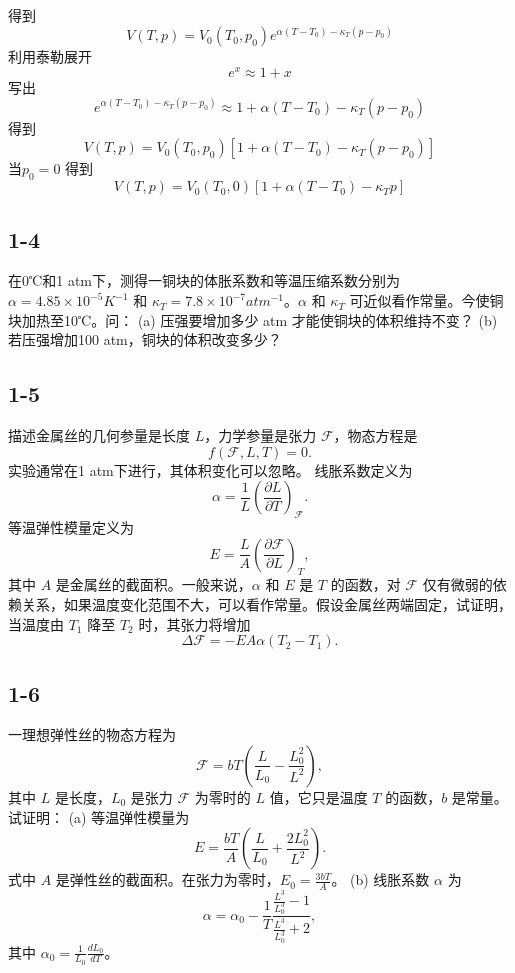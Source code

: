 得到
\begin{equation}
    V(T,p)=V_0(T_0,p_0)e^{\alpha \left( T-T_0 \right) -\kappa _T\left( p-p_0 \right)}
\end{equation}
利用泰勒展开
\begin{equation}
    e^x\approx 1+x
\end{equation}
写出
\begin{equation}
    e^{\alpha \left( T-T_0 \right) -\kappa _T\left( p-p_0 \right)}\approx 1+\alpha \left( T-T_0 \right) -\kappa _T\left( p-p_0 \right) 
\end{equation}
得到
\begin{equation}
    V(T,p)=V_0(T_0,p_0)\left[ 1+\alpha \left( T-T_0 \right) -\kappa _T\left( p-p_0 \right) \right] 
\end{equation}
当$p_0=0$
得到
\begin{equation}
    V(T,p)=V_0(T_0,0)\left[ 1+\alpha \left( T-T_0 \right) -\kappa _Tp \right] 
\end{equation}

\newpage
\subsection{1-4}
在0℃和1 atm下，测得一铜块的体胀系数和等温压缩系数分别为 $\alpha = 4.85 \times 10^{-5} K^{-1}$ 和 $\kappa_T = 7.8 \times 10^{-7} atm^{-1}$。$\alpha$ 和 $\kappa_T$ 可近似看作常量。今使铜块加热至10℃。问：
(a) 压强要增加多少 atm 才能使铜块的体积维持不变？
(b) 若压强增加100 atm，铜块的体积改变多少？

\newpage
\subsection{1-5}
描述金属丝的几何参量是长度 $L$，力学参量是张力 $\mathcal{F}$，物态方程是
$$f(\mathcal{F}, L, T) = 0.$$
实验通常在1 atm下进行，其体积变化可以忽略。
线胀系数定义为
$$\alpha = \frac{1}{L} \left( \frac{\partial L}{\partial T} \right)_{\mathcal{F}}.$$
等温弹性模量定义为
$$E = \frac{L}{A} \left( \frac{\partial \mathcal{F}}{\partial L} \right)_T,$$
其中 $A$ 是金属丝的截面积。一般来说，$\alpha$ 和 $E$ 是 $T$ 的函数，对 $\mathcal{F}$ 仅有微弱的依赖关系，如果温度变化范围不大，可以看作常量。假设金属丝两端固定，试证明，当温度由 $T_1$ 降至 $T_2$ 时，其张力将增加
$$\Delta \mathcal{F} = - E A \alpha (T_2 - T_1).$$

\newpage
\subsection{1-6}
一理想弹性丝的物态方程为
$$\mathcal{F} = bT \left( \frac{L}{L_0} - \frac{L_0^2}{L^2} \right),$$
其中 $L$ 是长度，$L_0$ 是张力 $\mathcal{F}$ 为零时的 $L$ 值，它只是温度 $T$ 的函数，$b$ 是常量。试证明：
(a) 等温弹性模量为
$$E = \frac{bT}{A} \left( \frac{L}{L_0} + \frac{2L_0^2}{L^2} \right).$$
式中 $A$ 是弹性丝的截面积。在张力为零时，$E_0 = \frac{3bT}{A}$。
(b) 线胀系数 $\alpha$ 为
$$\alpha = \alpha_0 - \frac{1}{T} \frac{\frac{L^3}{L_0^3} - 1}{\frac{L^3}{L_0^3} + 2},$$
其中 $\alpha_0 = \frac{1}{L_0} \frac{dL_0}{dT}$。

